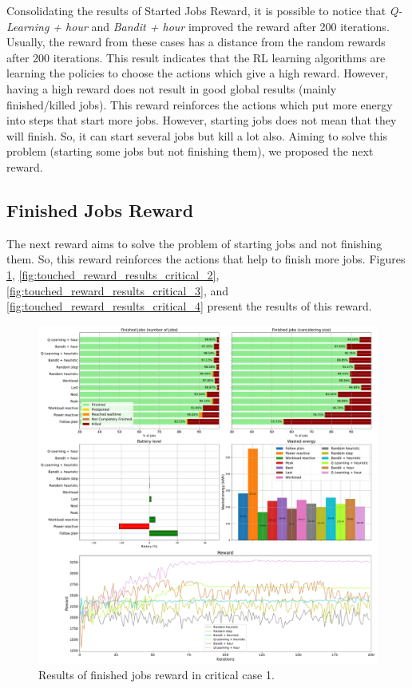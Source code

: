 Consolidating the results of Started Jobs Reward, it is possible to notice that \emph{Q-Learning + hour} and \emph{Bandit + hour} improved the reward after 200 iterations. Usually, the reward from these cases has a distance from the random rewards after 200 iterations. This result indicates that the RL learning algorithms are learning the policies to choose the actions which give a high reward. However, having a high reward does not result in good global results (mainly finished/killed jobs). This reward reinforces the actions which put more energy into steps that start more jobs. However, starting jobs does not mean that they will finish. So, it can start several jobs but kill a lot also. Aiming to solve this problem (starting some jobs but not finishing them), we proposed the next reward.

\subsection{Finished Jobs Reward}

The next reward aims to solve the problem of starting jobs and not finishing them. So, this reward reinforces the actions that help to finish more jobs. Figures \ref{fig:touched_reward_results_critical_1}, \ref{fig:touched_reward_results_critical_2}, \ref{fig:touched_reward_results_critical_3}, and \ref{fig:touched_reward_results_critical_4} present the results of this reward. 

\begin{figure}[!htb]
    \centering
    \includegraphics[scale=0.29]{Images/Learning_compensations/reward_finished_touched_profile_best_workload_1_with_noise_state_delta.pdf}
    \caption{Results of finished jobs reward in critical case 1.}
    \label{fig:touched_reward_results_critical_1}
\end{figure}

